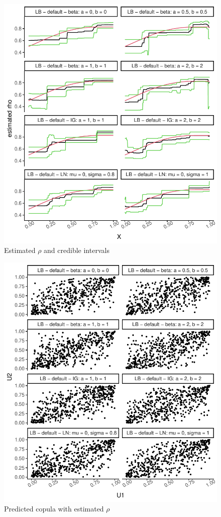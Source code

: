 \documentclass{amsart}
\begin{document}
\fi
\begin{figure}[ht]
	\centering
	\includegraphics[width=0.95\linewidth]{predicted_rho_2.pdf}
	\caption{Estimated $\rho$ and credible intervals}
	\label{fig:pred:rho:2}
\end{figure}

\begin{figure}[ht]
	\centering
	\includegraphics[width=0.95\linewidth]{simulated_copula_2.pdf}
	\caption{Predicted copula with estimated $\rho$}
	\label{fig:sim:copula:2}
\end{figure}
\end{document}

